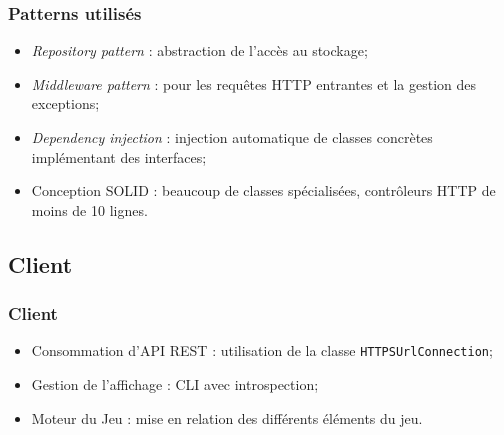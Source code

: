 	\begin{frame}
		\frametitle{Patterns utilisés}
		\begin{itemize}
			\item \textit{Repository pattern} : abstraction de l'accès au stockage;
			\item \textit{Middleware pattern} : pour les requêtes HTTP entrantes et la gestion des exceptions;
			\item \textit{Dependency injection} : injection automatique de classes concrètes implémentant des interfaces;
			\item Conception SOLID : beaucoup de classes spécialisées, contrôleurs HTTP de moins de 10 lignes.
		\end{itemize}
	\end{frame}

\subsection{Client}
	\begin{frame}
		\frametitle{Client}
		\begin{itemize}
			\item Consommation d'API REST : utilisation de la classe \texttt{HTTPSUrlConnection}; \newline
			\item Gestion de l'affichage : CLI avec introspection; \newline
			\item Moteur du Jeu : mise en relation des différents éléments du jeu.
		\end{itemize}
	\end{frame}
